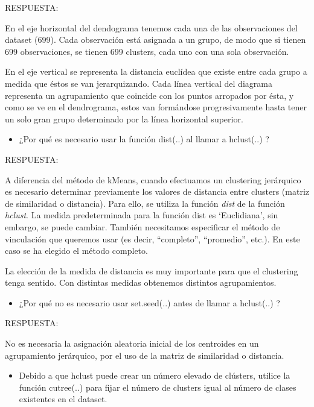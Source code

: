 \documentclass[]{article}
\providecommand{\tightlist}{%
  \setlength{\itemsep}{0pt}\setlength{\parskip}{0pt}}
\begin{document}
RESPUESTA:

En el eje horizontal del dendograma tenemos cada una de las
observaciones del dataset (699). Cada observación está asignada a un
grupo, de modo que si tienen 699 observaciones, se tienen 699 clusters,
cada uno con una sola observación.

En el eje vertical se representa la distancia euclídea que existe entre
cada grupo a medida que éstos se van jerarquizando. Cada línea vertical
del diagrama representa un agrupamiento que coincide con los puntos
arropados por ésta, y como se ve en el dendrograma, estos van formándose
progresivamente hasta tener un solo gran grupo determinado por la línea
horizontal superior.

\begin{itemize}
\tightlist
\item
  ¿Por qué es necesario usar la función dist(..) al llamar a hclust(..)
  ?
\end{itemize}

RESPUESTA:

A diferencia del método de kMeans, cuando efectuamos un clustering
jerárquico es necesario determinar previamente los valores de distancia
entre clusters (matriz de similaridad o distancia). Para ello, se
utiliza la función \emph{dist} de la función \emph{hclust}. La medida
predeterminada para la función dist es `Euclidiana', sin embargo, se
puede cambiar. También necesitamos especificar el método de vinculación
que queremos usar (es decir, ``completo'', ``promedio'', etc.). En este
caso se ha elegido el método completo.

La elección de la medida de distancia es muy importante para que el
clustering tenga sentido. Con distintas medidas obtenemos distintos
agrupamientos.

\begin{itemize}
\tightlist
\item
  ¿Por qué no es necesario usar set.seed(..) antes de llamar a
  hclust(..) ?
\end{itemize}

RESPUESTA:

No es necesaria la asignación aleatoria inicial de los centroides en un
agrupamiento jerárquico, por el uso de la matriz de similaridad o
distancia.

\begin{itemize}
\tightlist
\item
  Debido a que hclust puede crear un número elevado de clústers, utilice
  la función cutree(..) para fijar el número de clusters igual al número
  de clases existentes en el dataset.
\end{itemize}
\end{document}
